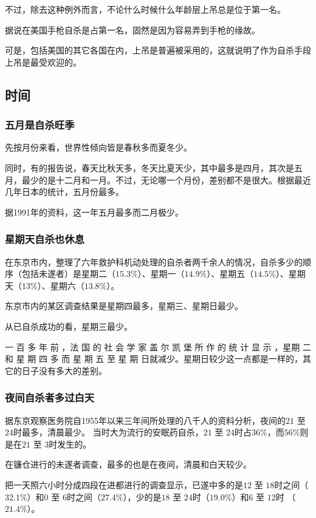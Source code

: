 \documentclass[UTF8]{ctexart}
\begin{document}
不过，除去这种例外而言，不论什么时候什么年龄层上吊总是位于第一名。

据说在美国手枪自杀是占第一名，固然是因为容易弄到手枪的缘故。

可是，包括美国的其它各国在内，上吊是普遍被采用的，这就说明了作为自杀手段上吊是最受欢迎的。

\subsection{时间}

\subsubsection*{五月是自杀旺季}

先按月份来看，世界性倾向皆是春秋多而夏冬少。

同时，有的报告说，春天比秋天多，冬天比夏天少，其中最多是四月，其次是五月，最少的是十二月和一月。不过，无论哪一个月份，差别都不是很大。根据最近几年日本的统计，五月份最多。

据1991年的资料，这一年五月最多而二月极少。

\subsubsection*{星期天自杀也休息}

在东京市内，整理了六年救护科机动处理的自杀者两千余人的情况，自杀多少的顺序（包括未遂者）是星期二（$15.3\%$）、星期一（$14.9\%$）、星期五（$14.5\%$）、星期天（$13\%$）、星期六（$13.8\%$）。

东京市内的某区调查结果是星期四最多，星期三、星期日最少。

从已自杀成功的看，星期三最少。

一 百 多 年 前 ，法 国 的 社 会 学 家 盖 尔 凯 堡 所 作 的 统 计 显 示 ，星期 二 和 星 期 四 多 而 星 期 五 至 星 期 日就减少。星期日较少这一点都是一样的，其它的日子没有多大的差别。

\subsubsection*{夜间自杀者多过白天}

据东京观察医务院自1955年以来三年间所处理的八千人的资料分析，夜间的$21$ 至 $24$时最多，清晨最少。
当时大为流行的安眠药自杀，$21$ 至 $24$时占$36\%$，而$56\%$则是在$21$ 至 $3$时发生的。

在镰仓进行的未遂者调查，最多的也是在夜间，清晨和白天较少。

把一天照六小时分成四段在进都进行的调查显示，已遂中多的是$12$ 至 $18$时之间（$32.1\%$）和$0$ 至 $6$时之间（$27.4\%$），少的是$18$ 至 $24$时（$19.0\%$）和$6$ 至 $12$时 （$21.4\%$）。
\end{document}
